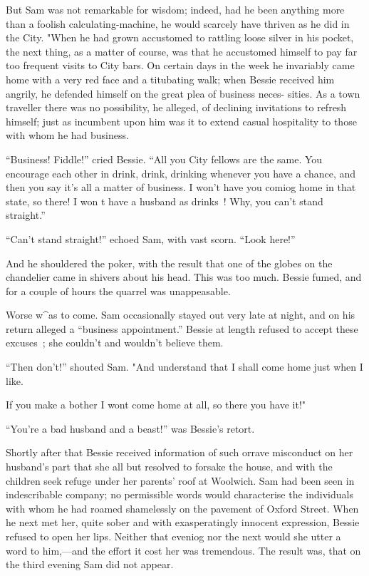 But Sam was not remarkable for wisdom; indeed, had he been anything more
than a foolish calculating-machine, he would scarcely have thriven as he
did in the City. "When he had grown accustomed to rattling loose silver
in his pocket, the next thing, as a matter of course, was that he
accustomed himself to pay far too frequent visits to City bars. On
certain days in the week he invariably came home with a very red face
and a titubating walk; when Bessie received him angrily, he defended
himself on the great plea of business neces-
{\protect\hypertarget{292}{}{}} sities. As a town traveller there was no
possibility, he alleged, of declining invitations to refresh himself;
just as incumbent upon him was it to extend casual hospitality to those
with whom he had business.

``Business! Fiddle!'' cried Bessie. ``All you City fellows are the same.
You encourage each other in drink, drink, drinking whenever you have a
chance, and then you say it's all a matter of business. I won't have you
comiog home in that state, so there! I won t have a husband as drinks~!
Why, you can't stand straight.''

``Can't stand straight!'' echoed Sam, with vast scorn. ``Look here!''

And he shouldered the poker, with the result that one of the globes on
the chandelier came in shivers about his head. This was too much. Bessie
fumed, and for a couple of hours the quarrel was unappeasable.

Worse w\^{}as to come. Sam occasionally stayed out very late at night,
and on his return alleged a ``business appointment.'' Bessie at length
refused to accept these excuses~; she couldn't and wouldn't believe
them.

``Then don't!'' shouted Sam. "And understand that I shall come home just
when I like.

{\protect\hypertarget{293}{}{}} If you make a bother I wont come home at
all, so there you have it!"

``You're a bad husband and a beast!'' was Bessie's retort.

Shortly after that Bessie received information of such orrave misconduct
on her husband's part that she all but resolved to forsake the house,
and with the children seek refuge under her parents' roof at Woolwich.
Sam had been seen in indescribable company; no permissible words would
characterise the individuals with whom he had roamed shamelessly on the
pavement of Oxford Street. When he next met her, quite sober and with
exasperatingly innocent expression, Bessie refused to open her lips.
Neither that eveniog nor the next would she utter a word to him,---and
the effort it cost her was tremendous. The result was, that on the third
evening Sam did not appear.

